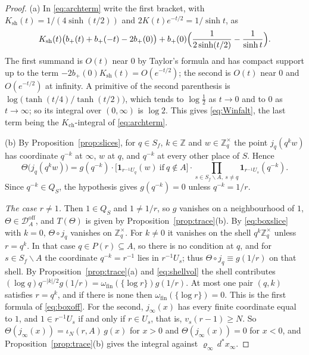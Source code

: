 \documentclass[11pt]{amsart}
\theoremstyle{definition}
\newcommand{\Z}{\mathbb Z}
\newcommand{\Ksh}{K_{\mathrm{sh}}}
\newcommand{\Kch}{K_{\mathrm{ch}}}
\newcommand{\Doff}{\mathcal D_A^{\mathrm{off}}}
\begin{document}
\begin{proof}
(a) In \eqref{eq:archterm} write the first bracket, with
$\Ksh(t)=1/(4\sinh(t/2))$ and $2K(t)e^{-t/2}=1/\sinh t$, as
\[
  \Ksh(t)\bigl(b_+(t)+b_+(-t)-2b_+(0)\bigr)
  +b_+(0)\Bigl(\frac1{2\sinh(t/2)}-\frac1{\sinh t}\Bigr).
\]
The first summand is $O(t)$ near $0$ by Taylor's formula and has compact
support up to the term $-2b_+(0)\Ksh(t)=O(e^{-t/2})$; the second is $O(t)$ near
$0$ and $O(e^{-t/2})$ at infinity. A primitive of the second parenthesis is
$\log\bigl(\tanh(t/4)/\tanh(t/2)\bigr)$, which tends to $\log\tfrac12$ as
$t\to0$ and to $0$ as $t\to\infty$; so its integral over $(0,\infty)$ is
$\log2$. This gives \eqref{eq:Winfalt}, the last term being the $\Kch$-integral
of \eqref{eq:archterm}.

(b) By Proposition~\ref{prop:slices}, for $q\in S_f$, $k\in\Z$ and
$w\in\Z_q^\times$ the point $j_q(q^kw)$ has coordinate $q^{-k}$ at $\infty$,
$w$ at $q$, and $q^{-k}$ at every other place of $S$. Hence
\begin{equation}\label{eq:boxslice}
  \Theta\bigl(j_q(q^kw)\bigr)=g(q^{-k})\cdot
   \bigl[\mathbf 1_{r^{-1}U_q}(w)\ \text{if}\ q\notin A\bigr]\cdot
   \prod_{s\in S_f\smallsetminus A,\ s\ne q}\mathbf 1_{r^{-1}U_s}(q^{-k}) .
\end{equation}
Since $q^{-k}\in Q_S$, the hypothesis gives $g(q^{-k})=0$ unless $q^{-k}=1/r$.

\emph{The case $r\ne1$.} Then $1\in Q_S$ and $1\ne1/r$, so $g$ vanishes on a
neighbourhood of $1$, $\Theta\in\Doff$, and $T(\Theta)$ is given by
Proposition~\ref{prop:trace}(b). By \eqref{eq:boxslice} with $k=0$, $\Theta\circ
j_q$ vanishes on $\Z_q^\times$. For $k\ne0$ it vanishes on the shell
$q^k\Z_q^\times$ unless $r=q^k$. In that case $q\in P(r)\subseteq A$, so there
is no condition at $q$, and for $s\in S_f\smallsetminus A$ the coordinate
$q^{-k}=r^{-1}$ lies in $r^{-1}U_s$; thus $\Theta\circ j_q\equiv g(1/r)$ on that
shell. By Proposition~\ref{prop:trace}(a) and \eqref{eq:shellvol} the shell
contributes $(\log q)q^{-|k|/2}g(1/r)=\omega_{\mathrm{fin}}(\{\log r\})g(1/r)$.
At most one pair $(q,k)$ satisfies $r=q^k$, and if there is none then
$\omega_{\mathrm{fin}}(\{\log r\})=0$. This is the first formula of
\eqref{eq:boxoff}. For the second, $j_\infty(x)$ has every finite coordinate
equal to $1$, and $1\in r^{-1}U_s$ if and only if $r\in U_s$, that is,
$v_s(r-1)\ge N$. So $\Theta(j_\infty(x))=\iota_N(r,A)\,g(x)$ for $x>0$ and
$\Theta(j_\infty(x))=0$ for $x<0$, and Proposition~\ref{prop:trace}(b) gives the
integral against $\varrho_\infty\,d^*x_\infty$.


\end{proof}
\end{document}
